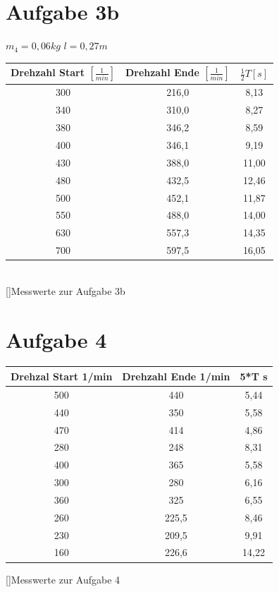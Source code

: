 \documentclass[12pt,a4paper,]{scrreprt}
\begin{document}
            \section{Aufgabe 3b}
            $m_4 = 0,06 kg$ $l= 0,27 m $
            \begin{center}
            \begin{tabular}{cc|c}
            Drehzahl Start $[\frac{1}{min}]$&Drehzahl Ende $[\frac{1}{min}]$& $\frac{1}{2}T [s]$  \\ \hline \hline
            300	&216,0	&8,13\\
            340	&310,0	&8,27\\
            380	&346,2	&8,59\\
            400	&346,1	&9,19\\
            430	&388,0	&11,00\\
            480	&432,5	&12,46\\
            500	&452,1	&11,87\\
            550	&488,0	&14,00\\
            630	&557,3	&14,35\\
            700	&597,5	&16,05
            \end{tabular} \\
                 []{Messwerte zur Aufgabe 3b}
            \end{center}
			\section{Aufgabe 4}
            \begin{center}
            \begin{tabular}{cc|c}
            Drehzal Start 1/min	&Drehzahl Ende 1/min	&5*T s \\ \hline \hline
              500	&440	&5,44\\
              440	&350	&5,58\\
              470	&414	&4,86\\
              280	&248	&8,31\\
              400	&365	&5,58\\
              300	&280	&6,16\\
              360	&325	&6,55\\
              260	&225,5	&8,46\\
              230	&209,5	&9,91\\
              160	&226,6	&14,22
            \end{tabular}
            []{Messwerte zur Aufgabe 4}
            \end{center}
	\pagebreak
\end{document}
